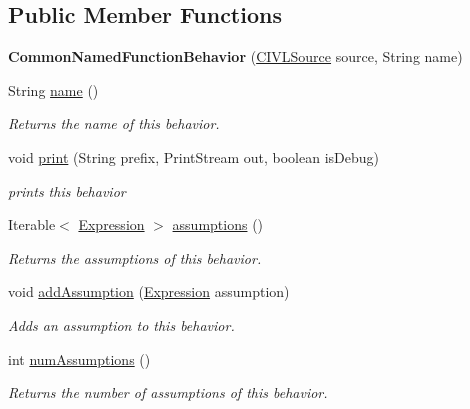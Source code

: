 \subsection*{Public Member Functions}
\begin{DoxyCompactItemize}
\item 
\hypertarget{classedu_1_1udel_1_1cis_1_1vsl_1_1civl_1_1model_1_1common_1_1contract_1_1CommonNamedFunctionBehavior_a9623cb966c99c6eeecb5d6b26c46cb0f}{}{\bfseries Common\+Named\+Function\+Behavior} (\hyperlink{interfaceedu_1_1udel_1_1cis_1_1vsl_1_1civl_1_1model_1_1IF_1_1CIVLSource}{C\+I\+V\+L\+Source} source, String name)\label{classedu_1_1udel_1_1cis_1_1vsl_1_1civl_1_1model_1_1common_1_1contract_1_1CommonNamedFunctionBehavior_a9623cb966c99c6eeecb5d6b26c46cb0f}

\item 
String \hyperlink{classedu_1_1udel_1_1cis_1_1vsl_1_1civl_1_1model_1_1common_1_1contract_1_1CommonNamedFunctionBehavior_a20779c9f90e91564bac1c16e8ba0867a}{name} ()
\begin{DoxyCompactList}\small\item\em Returns the name of this behavior. \end{DoxyCompactList}\item 
void \hyperlink{classedu_1_1udel_1_1cis_1_1vsl_1_1civl_1_1model_1_1common_1_1contract_1_1CommonNamedFunctionBehavior_aa18a0646de0b39fe3cebb2d1c27f6b89}{print} (String prefix, Print\+Stream out, boolean is\+Debug)
\begin{DoxyCompactList}\small\item\em prints this behavior \end{DoxyCompactList}\item 
Iterable$<$ \hyperlink{interfaceedu_1_1udel_1_1cis_1_1vsl_1_1civl_1_1model_1_1IF_1_1expression_1_1Expression}{Expression} $>$ \hyperlink{classedu_1_1udel_1_1cis_1_1vsl_1_1civl_1_1model_1_1common_1_1contract_1_1CommonNamedFunctionBehavior_aa841c1ced0f4181ccc54c20f75f27a5a}{assumptions} ()
\begin{DoxyCompactList}\small\item\em Returns the assumptions of this behavior. \end{DoxyCompactList}\item 
void \hyperlink{classedu_1_1udel_1_1cis_1_1vsl_1_1civl_1_1model_1_1common_1_1contract_1_1CommonNamedFunctionBehavior_aef422ce476a96c2569dbfc814244c54e}{add\+Assumption} (\hyperlink{interfaceedu_1_1udel_1_1cis_1_1vsl_1_1civl_1_1model_1_1IF_1_1expression_1_1Expression}{Expression} assumption)
\begin{DoxyCompactList}\small\item\em Adds an assumption to this behavior. \end{DoxyCompactList}\item 
int \hyperlink{classedu_1_1udel_1_1cis_1_1vsl_1_1civl_1_1model_1_1common_1_1contract_1_1CommonNamedFunctionBehavior_a20aada4f7dc8e4509f2cd6d2d55d6edd}{num\+Assumptions} ()
\begin{DoxyCompactList}\small\item\em Returns the number of assumptions of this behavior. \end{DoxyCompactList}\end{DoxyCompactItemize}


